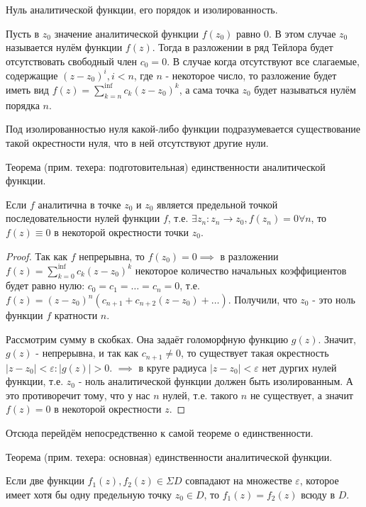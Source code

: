 Нуль аналитической функции, его порядок и изолированность.

Пусть в $z_0$ значение аналитической функции $f(z_0)$ равно 0. В этом случае $z_0$ называется нулём функции $f(z)$. Тогда в разложении в ряд Тейлора будет отсутствовать свободный член $c_0=0$. В случае когда отсутствуют все слагаемые, содержащие $(z - z_0)^i, i < n$, где $n$ - некоторое число, то разложение будет иметь вид $f(z) = \sum_{k=n}^{\inf}c_k(z-z_0)^k$, а сама точка $z_0$ будет называться нулём порядка $n$.

Под изолированностью нуля какой-либо функции подразумевается существование такой окрестности нуля, что в ней отсутствуют другие нули.

\begin{theorem*}
	Теорема (прим. техера: подготовительная) единственности аналитической функции.
	
	Если $f$ аналитична в точке $z_0$ и $z_0$ является предельной точкой последовательности нулей функции $f$, т.е. $\exists{z_n}: z_n \rightarrow z_0, f(z_n) = 0 \forall n$, то $f(z)\equiv0$ в некоторой окрестности точки $z_0$.
\end{theorem*}

\begin{proof}
	Так как $f$ непрерывна, то $f(z_0) = 0 \implies$ в разложении $f(z) = \sum_{k=0}^{\inf} c_k(z-z_0)^k$ некоторое количество начальных коэффициентов будет равно нулю: $c_0 = c_1 = \dots = c_n = 0$, т.е. $f(z) = (z-z_0)^n (c_{n+1} + c_{n+2}(z-z_0) + \dots)$. Получили, что $z_0$ - это ноль функции $f$ кратности $n$.
	
	Рассмотрим сумму в скобках. Она задаёт голоморфную функцию $g(z)$. Значит, $g(z)$ - непрерывна, и так как $c_{n+1} \neq 0$, то существует такая окрестность $|z - z_0| < \varepsilon: |g(z)| > 0$. $\implies$ в круге радиуса $|z-z_0| < \varepsilon$ нет дургих нулей функции, т.е. $z_0$ - ноль аналитической функции должен быть изолированным. А это противоречит тому, что у нас $n$ нулей, т.е. такого $n$ не существует, а значит $f(z) = 0$ в некоторой окрестности $z$.
\end{proof}

Отсюда перейдём непосредственно к самой теореме о единственности. 

\begin{theorem*}
	Теорема (прим. техера: основная) единственности аналитической функции.
	
	Если две функции $f_1(z), f_2(z) \in \Sigma D$ совпадают на множестве $\varepsilon$, которое имеет хотя бы одну предельную точку $z_0 \in D$, то $f_1(z) = f_2(z)$ всюду в $D$.
\end{theorem*}


